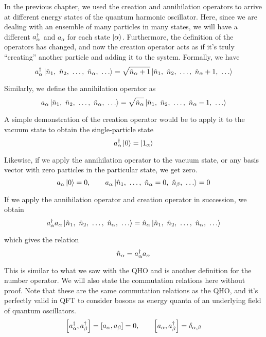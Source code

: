 In the previous chapter, we used the creation and annihilation operators to arrive at different energy states of the quantum harmonic oscillator. Here, since we are dealing with an ensemble of many particles in many states, we will have a different $a^{\dagger}_{\alpha}$ and $a_{\alpha}$ for each state $\ket{\alpha}$. Furthermore, the definition of the operators has changed, and now the creation operator acts as if it's truly ``creating'' another particle and adding it to the system. Formally, we have
\begin{equation}
	\ad_{\alpha} \ket{\hat{n}_1,\ \hat{n}_2,\ \dots,\ \hat{n}_{\alpha},\ \dots} = \sqrt{\hat{n}_{\alpha}+1}\ket{\hat{n}_1,\ \hat{n}_2,\ \dots,\ \hat{n}_{\alpha}+1,\ \dots}
\end{equation} 

Similarly, we define the annihilation operator as
\begin{equation}
a_{\alpha} \ket{\hat{n}_1,\ \hat{n}_2,\ \dots,\ \hat{n}_{\alpha},\ \dots} = \sqrt{\hat{n}_{\alpha}}\ket{\hat{n}_1,\ \hat{n}_2,\ \dots,\ \hat{n}_{\alpha}-1,\ \dots}
\end{equation} 

A simple demonstration of the creation operator would be to apply it to the vacuum state to obtain the single-particle state
\begin{equation}
	a^{\dagger}_{\alpha} \ket{0} = \ket{1_{\alpha}}
\end{equation}

Likewise, if we apply the annihilation operator to the vacuum state, or any basis vector with zero particles in the particular state, we get zero.
\begin{equation}
	a_{\alpha} \ket{0} = 0, \qquad a_{\alpha} \ket{\hat{n}_1,\ \dots,\ \hat{n}_{\alpha}=0,\ \hat{n}_{\beta},\ \dots} = 0
\end{equation}

If we apply the annihilation operator and creation operator in succession, we obtain
\begin{equation*}
\ad_{\alpha} a_{\alpha} \ket{\hat{n}_1,\ \hat{n}_2,\ \dots,\ \hat{n}_{\alpha},\ \dots} = \hat{n}_{\alpha}\ket{\hat{n}_1,\ \hat{n}_2,\ \dots,\ \hat{n}_{\alpha},\ \dots}
\end{equation*}

which gives the relation
\begin{equation}
	\hat{n}_{\alpha} = a^{\dagger}_{\alpha}a_{\alpha}
\end{equation}


This is similar to what we saw with the QHO and is another definition for the number operator. We will also state the commutation relations here without proof. Note that these are the same commutation relations as the QHO, and it's perfectly valid in QFT to consider bosons as energy quanta of an underlying field of quantum oscillators.
\begin{equation}
	\left[a^{\dagger}_{\alpha},a^{\dagger}_{\beta}\right] = \left[a_{\alpha},a_{\beta}\right] = 0, \qquad \left[a_{\alpha}, a^{\dagger}_{\beta}\right] = \delta_{\alpha,\beta}
\end{equation}

